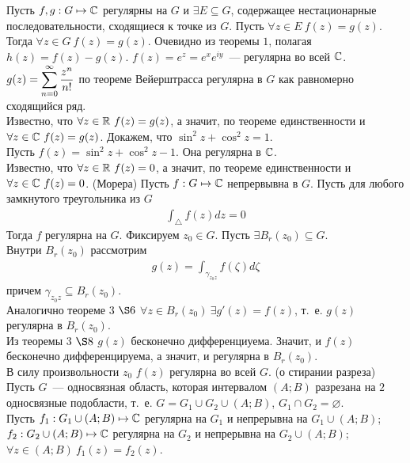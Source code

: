 \corollary
Пусть $f, g: G \mapsto \mathbb{C}$ регулярны на $G$ и $\exists E \subseteq G$,
содержащее нестационарные последовательности, сходящиеся к точке из $G$. Пусть
$\forall z \in E \ f(z) = g(z)$.
\\
Тогда $\forall z \in G \ f(z) = g(z)$.
\pr
Очевидно из теоремы $1$, полагая $h(z) = f(z) - g(z)$.
\example
$f(z) = e^z = e^{x}e^{iy}$~--- регулярна во всей $\mathbb{C}$.
\\
$g(z) = \displaystyle \sum_{n=0}^{\infty} \displaystyle \frac{z^n}{n!}$ по теореме Вейерштрасса
регулярна в $G$ как равномерно сходящийся ряд.
\\
Известно, что $\forall z \in \mathbb{R} \ f(z) = g(z)$, а значит, по теореме
единственности и $\forall z \in \mathbb{C} \ f(z) = g(z)$.
\example
Докажем, что $\sin^2 z + \cos^2 z = 1$.
\\
Пусть $f(z) = \sin^2 z + \cos^2 z - 1$. Она регулярна в $\mathbb{C}$.
\\
Известно, что $\forall z \in \mathbb{R} \ f(z) = 0$, а значит, по теореме
единственности и $\forall z \in \mathbb{C} \ f(z) = 0$.
\theorem (Морера)
Пусть $f: G \mapsto \mathbb{C}$ непрервывна в $G$. Пусть для любого замкнутого
треугольника из $G$
\begin{align*}
  \int_{\triangle}f(z) dz = 0
\end{align*}
Тогда $f$ регулярна на $G$.
\pr
Фиксируем $z_0 \in G$. Пусть $\exists B_r(z_0)\subseteq G$.
\\
Внутри $B_r(z_0)$ рассмотрим
\begin{align*}
  g(z) = \int_{\gamma_{z_0 z}}f(\zeta) d \zeta
\end{align*}
причем $\gamma_{z_0z}\subseteq B_{r}(z_0)$.
\\
Аналогично теореме $3$ $\S 6$ $\forall z \in B_r(z_0) \ \exists g'(z) = f(z)$,
т.~е. $g(z)$ регулярна в $B_r(z_0)$.
\\
Из теоремы $3$ $\S8$ $g(z)$ бесконечно дифференциуема. Значит, и $f(z)$
бесконечно дифференцируема, а значит, и регулярна в $B_r(z_0)$.
\\
В силу произвольности $z_0$ $f(z)$ регулярна во всей $G$.
\theorem (о стирании разреза)
Пусть $G$~--- односвязная область, которая интервалом $(A;B)$ разрезана на $2$
односвязные подобласти, т.~е. $G = G_1 \cup G_2 \cup (A;B)$, $G_1 \cap G_2 =
\varnothing$.
\\
Пусть $f_1: G_1 \cup (A;B) \mapsto \mathbb{C}$ регулярна на $G_1$ и непрерывна на $G_1
\cup (A;B)$; $f_2: G_2 \cup (A;B) \mapsto \mathbb{C}$ регулярна на $G_2$ и непрерывна
на $G_2 \cup (A;B)$; $\forall z \in (A;B) \ f_1(z) = f_2(z)$.
\\
